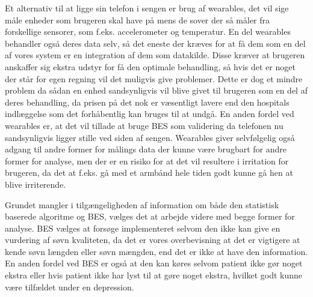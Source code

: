 Et alternativ til at ligge sin telefon i sengen er brug af wearables, det vil sige måle enheder som brugeren skal have på mens de sover der så måler fra forskellige sensorer, som f.eks. accelerometer og temperatur.
En del wearables behandler også deres data selv, så det eneste der kræves for at få dem som en del af vores system er en integration af dem som datakilde.
Disse kræver at brugeren anskaffer sig ekstra udstyr for få den optimale behandling, så hvis det er noget der står for egen regning vil det muligvis give problemer.
Dette er dog et mindre problem da sådan en enhed sandsynligvis vil blive givet til brugeren som en del af deres behandling, da prisen på det nok er væsentligt lavere end den hospitals indlæggelse som det forhåbentlig kan bruges til at undgå. 
En anden fordel ved wearables er, at det vil tillade at bruge BES som validering da telefonen nu sandsynligvis ligger stille ved siden af sengen.
Wearables giver selvfølgelig også adgang til andre former for målings data der kunne være brugbart for andre former for analyse, men der er en risiko for at det vil resultere i irritation for brugeren, da det at f.eks. gå med et armbånd hele tiden godt kunne gå hen at blive irriterende.

Grundet mangler i tilgængeligheden af information om både den statistisk baserede algoritme og BES, vælges det at arbejde videre med begge former for analyse.
BES vælges at forsøge implementeret selvom den ikke kan give en vurdering af søvn kvaliteten, da det er vores overbevisning at det er vigtigere at kende søvn længden eller søvn mængden, end det er ikke at have den information.
En anden fordel ved BES er også at den kan køres selvom patient ikke gør noget ekstra eller hvis patient ikke har lyst til at gøre noget ekstra, hvilket godt kunne være tilfældet under en depression.


